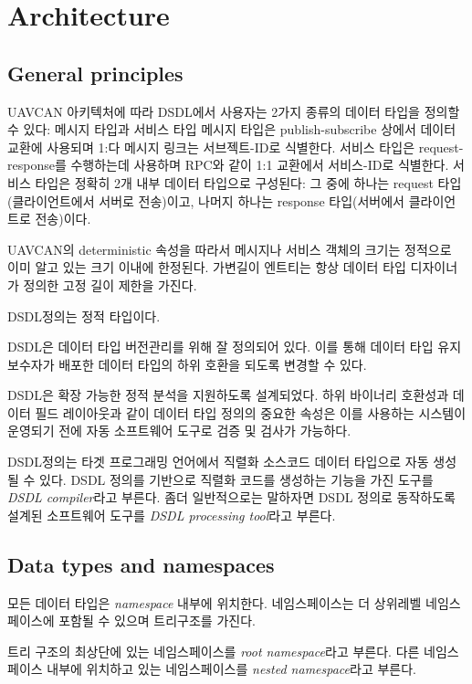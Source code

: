 \section{Architecture}

\subsection{General principles}

UAVCAN 아키텍처에 따라 DSDL에서 사용자는 2가지 종류의 데이터 타입을 정의할 수 있다:
메시지 타입과 서비스 타입
메시지 타입은 publish-subscribe 상에서 데이터 교환에 사용되며 1:다 메시지 링크는 서브젝트-ID로 식별한다. 서비스 타입은 request-response를 수행하는데 사용하며 RPC와 같이 1:1 교환에서 서비스-ID로 식별한다.
서비스 타입은 정확히 2개 내부 데이터 타입으로 구성된다:
그 중에 하나는 request 타입(클라이언트에서 서버로 전송)이고,
나머지 하나는 response 타입(서버에서 클라이언트로 전송)이다.

UAVCAN의 deterministic 속성을 따라서 메시지나 서비스 객체의 크기는 정적으로 이미 알고 있는 크기 이내에 한정된다.
가변길이 엔트티는 항상 데이터 타입 디자이너가 정의한 고정 길이 제한을 가진다.

DSDL정의는 정적 타입이다.

DSDL은 데이터 타입 버전관리를 위해 잘 정의되어 있다. 이를 통해 데이터 타입 유지보수자가 배포한 데이터 타입의 하위 호환을 되도록 변경할 수 있다.

DSDL은 확장 가능한 정적 분석을 지원하도록 설계되었다. 하위 바이너리 호환성과 데이터 필드 레이아웃과 같이 데이터 타입 정의의 중요한 속성은 이를 사용하는 시스템이 운영되기 전에 자동 소프트웨어 도구로 검증 및 검사가 가능하다.

DSDL정의는 타겟 프로그래밍 언어에서 직렬화 소스코드 데이터 타입으로 자동 생성될 수 있다.
DSDL 정의를 기반으로 직렬화 코드를 생성하는 기능을 가진 도구를 \emph{DSDL compiler}라고 부른다.
좀더 일반적으로는 말하자면 DSDL 정의로 동작하도록 설계된 소프트웨어 도구를 \emph{DSDL processing tool}라고 부른다.

\subsection{Data types and namespaces}

모든 데이터 타입은 \emph{namespace} 내부에 위치한다.
네임스페이스는 더 상위레벨 네임스페이스에 포함될 수 있으며 트리구조를 가진다.

트리 구조의 최상단에 있는 네임스페이스를 \emph{root namespace}라고 부른다.
다른 네임스페이스 내부에 위치하고 있는 네임스페이스를 \emph{nested namespace}라고 부른다.

